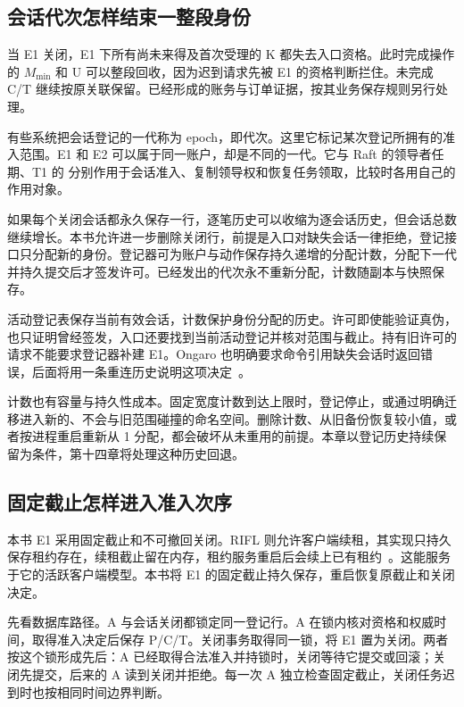 \subsection*{会话代次怎样结束一整段身份}

当 E1 关闭，E1 下所有尚未来得及首次受理的 K 都失去入口资格。此时完成操作的 $M_{\min}$ 和 U 可以整段回收，因为迟到请求先被 E1 的资格判断拦住。未完成 C/T 继续按原关联保留。已经形成的账务与订单证据，按其业务保存规则另行处理。

有些系统把会话登记的一代称为 epoch，即代次。这里它标记某次登记所拥有的准入范围。E1 和 E2 可以属于同一账户，却是不同的一代。它与 Raft 的领导者任期、T1 的  分别作用于会话准入、复制领导权和恢复任务领取，比较时各用自己的作用对象。

如果每个关闭会话都永久保存一行，逐笔历史可以收缩为逐会话历史，但会话总数继续增长。本书允许进一步删除关闭行，前提是入口对缺失会话一律拒绝，登记接口只分配新的身份。登记器可为账户与动作保存持久递增的分配计数，分配下一代并持久提交后才签发许可。已经发出的代次永不重新分配，计数随副本与快照保存。


活动登记表保存当前有效会话，计数保护身份分配的历史。许可即使能验证真伪，也只证明曾经签发，入口还要找到当前活动登记并核对范围与截止。持有旧许可的请求不能要求登记器补建 E1。Ongaro 也明确要求命令引用缺失会话时返回错误，后面将用一条重连历史说明这项决定~\cite{ongaro}。

计数也有容量与持久性成本。固定宽度计数到达上限时，登记停止，或通过明确迁移进入新的、不会与旧范围碰撞的命名空间。删除计数、从旧备份恢复较小值，或者按进程重启重新从 1 分配，都会破坏从未重用的前提。本章以登记历史持续保留为条件，第十四章将处理这种历史回退。

\subsection*{固定截止怎样进入准入次序}

本书 E1 采用固定截止和不可撤回关闭。RIFL 则允许客户端续租，其实现只持久保存租约存在，续租截止留在内存，租约服务重启后会续上已有租约~\cite{rifl}。这能服务于它的活跃客户端模型。本书将 E1 的固定截止持久保存，重启恢复原截止和关闭决定。

先看数据库路径。A 与会话关闭都锁定同一登记行。A 在锁内核对资格和权威时间，取得准入决定后保存 P/C/T。关闭事务取得同一锁，将 E1 置为关闭。两者按这个锁形成先后：A 已经取得合法准入并持锁时，关闭等待它提交或回滚；关闭先提交，后来的 A 读到关闭并拒绝。每一次 A 独立检查固定截止，关闭任务迟到时也按相同时间边界判断。

